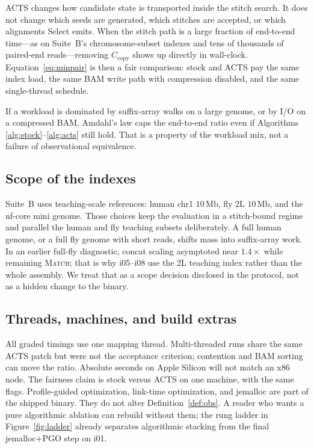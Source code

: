 \documentclass[11pt]{article}
\newcommand{\ACTS}{ACTS\xspace}
\begin{document}
\ACTS changes how candidate state is transported inside the stitch search.
It does not change which seeds are generated, which stitches are accepted, or
which alignments $\mathrm{Select}$ emits.
When the stitch path is a large fraction of end-to-end time---as on Suite~B's
chromosome-subset indexes and tens of thousands of paired-end reads---removing
$C_{\mathrm{copy}}$ shows up directly in wall-clock.
Equation~\eqref{eq:minpair} is then a fair comparison: stock and \ACTS pay the
same index load, the same BAM write path with compression disabled, and the
same single-thread schedule.

If a workload is dominated by suffix-array walks on a large genome, or by I/O
on a compressed BAM, Amdahl's law caps the end-to-end ratio even if Algorithms
\ref{alg:stock}--\ref{alg:acts} still hold.
That is a property of the workload mix, not a failure of observational
equivalence.

\subsection{Scope of the indexes}
\label{sec:scope}

Suite~B uses teaching-scale references: human chr1 $10\,\mathrm{Mb}$, fly 2L
$10\,\mathrm{Mb}$, and the nf-core mini genome.
Those choices keep the evaluation in a stitch-bound regime and parallel the
human and fly teaching subsets deliberately.
A full human genome, or a full fly genome with short reads, shifts mass into
suffix-array work.
In an earlier full-fly diagnostic, concat scaling asymptoted near $1.4\times$
while remaining \textsc{Match}; that is why i05--i08 use the 2L teaching
index rather than the whole assembly.
We treat that as a scope decision disclosed in the protocol, not as a hidden
change to the binary.

\subsection{Threads, machines, and build extras}
\label{sec:threats}

All graded timings use one mapping thread.
Multi-threaded runs share the same \ACTS patch but were not the acceptance
criterion; contention and BAM sorting can move the ratio.
Absolute seconds on Apple Silicon will not match an x86 node.
The fairness claim is stock versus \ACTS on one machine, with the same flags.
Profile-guided optimization, link-time optimization, and jemalloc are part of
the shipped binary.
They do not alter Definition~\ref{def:obs}.
A reader who wants a pure algorithmic ablation can rebuild without them; the
rung ladder in Figure~\ref{fig:ladder} already separates algorithmic stacking
from the final jemalloc+PGO step on i01.
\end{document}
